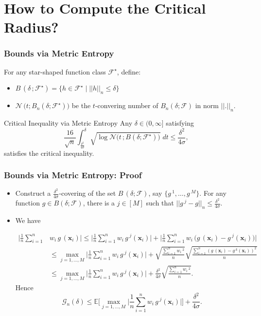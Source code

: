 \documentclass[11pt]{beamer}
\newcommand{\E}{\mathbb{E}}
\newcommand{\bx}{\mathbf{x}}
\newcommand{\cF}{\mathcal{F}}
\newcommand{\cG}{\mathcal{G}}
\begin{document}
	\section{How to Compute the Critical Radius?}
	\frame{\sectionpage}
	
	\begin{frame}
		\frametitle{Bounds via Metric Entropy}
		For any star-shaped function class $\cF^\star$, define:
		\begin{itemize}
			\item $B\,(\delta\,; \cF^\star) = \{h\in \cF^\star \;\big|\; ||h||_n\leq \delta\}$
			\item $\mathcal{N}\,\big(t; B_n(\delta; \cF^\star)\big)$ be the $t$-convering number of $B_n(\delta; \cF)$ in norm $||.||_n$.
		\end{itemize}

		\begin{block}{Critical Inequality via Metric Entropy}
			Any $\delta \in (0, \infty]$ satisfying
			\begin{equation*}
				\frac{16}{\sqrt{n}} \int_{\frac{\delta^2}{4\sigma}}^{\delta} \sqrt{\log \mathcal{N}\big(t\,; B(\delta; \cF^\star)\big)} \;dt \leq \frac{\delta^2}{4\sigma},
			\end{equation*}
			satisfies the critical inequality.
		\end{block}
	\end{frame}


	\begin{frame}
		\frametitle{Bounds via Metric Entropy: Proof}
		\begin{itemize}
		\item		
		Construct a $\frac{\delta^2}{4\sigma}$-covering of the set $B\,(\delta; \cF)$, say $\{g\,^1, \dots, g\,^M\}$. For any function $g\in B(\delta; \cF)$, there is a $j \in [M]$ such that $||g\,^j - g||_n \leq \frac{\delta^2}{4\sigma}$. 
		\item  We have
		\begin{small}
		\begin{align*}
			\Big|\frac{1}{n}\sum_{i = 1}^{n} &w_i\, g\,(\bx_i) \Big| \leq \Big|\frac{1}{n}\sum_{i = 1}^{n} w_i\, g\,^j(\bx_i) \Big| + \Big|\frac{1}{n}\sum_{i = 1}^{n} w_i\, \big(g\,(\bx_i) - g\,^j(\bx_i)\big) \Big|\\
			&\leq  \max_{j = 1, \dots, M} \Big|\frac{1}{n}\sum_{i = 1}^{n} w_i\, g\,^j(\bx_i) \Big| + \sqrt{\frac{\sum_{i = 1}^{n}w_i\,^2}{n}} \sqrt{\frac{\sum_{i = 1}^{n}(g\,(\bx_i) - g\,^k(\bx_i))^2}{n}}\\
			&\leq  \max_{j = 1, \dots, M} \Big|\frac{1}{n}\sum_{i = 1}^{n} w_i\, g\,^j(\bx_i) \Big| + \frac{\delta^2}{4\sigma}\sqrt{\frac{\sum_{i = 1}^{n}w_i\,^2}{n}}.
		\end{align*}
		Hence 
		\begin{equation*}
			\cG_n(\delta) \leq \E\Bigg[\max_{j = 1, \dots, M} \Big|\frac{1}{n}\sum_{i = 1}^{n} w_i\, g\,^j(\bx_i) \Big|\Bigg] + \frac{\delta^2}{4\sigma}.
		\end{equation*}
				\end{small}
		\end{itemize}
	\end{frame}
\end{document}
